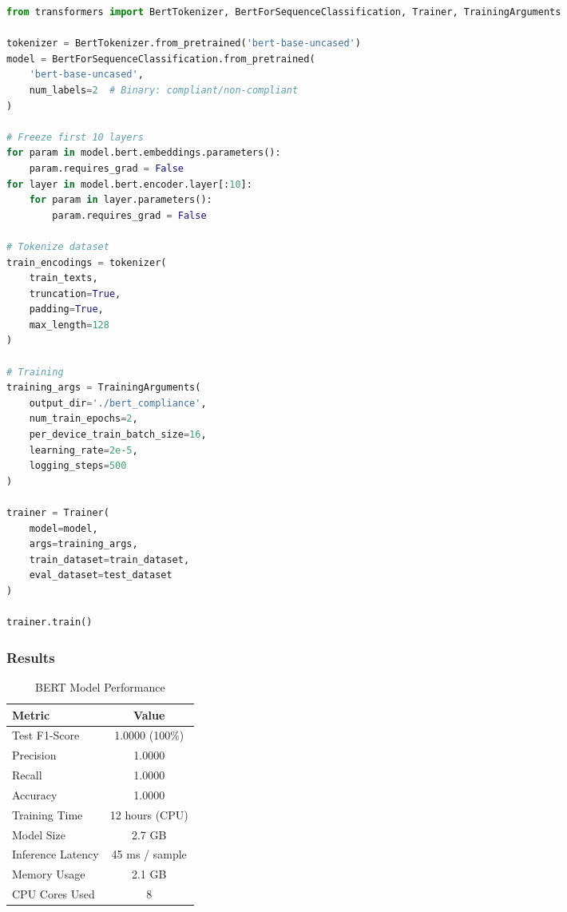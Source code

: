 \documentclass[11pt,conference]{IEEEtran}
\begin{document}
\begin{lstlisting}[language=Python]
from transformers import BertTokenizer, BertForSequenceClassification, Trainer, TrainingArguments

tokenizer = BertTokenizer.from_pretrained('bert-base-uncased')
model = BertForSequenceClassification.from_pretrained(
    'bert-base-uncased',
    num_labels=2  # Binary: compliant/non-compliant
)

# Freeze first 10 layers
for param in model.bert.embeddings.parameters():
    param.requires_grad = False
for layer in model.bert.encoder.layer[:10]:
    for param in layer.parameters():
        param.requires_grad = False

# Tokenize dataset
train_encodings = tokenizer(
    train_texts,
    truncation=True,
    padding=True,
    max_length=128
)

# Training
training_args = TrainingArguments(
    output_dir='./bert_compliance',
    num_train_epochs=2,
    per_device_train_batch_size=16,
    learning_rate=2e-5,
    logging_steps=500
)

trainer = Trainer(
    model=model,
    args=training_args,
    train_dataset=train_dataset,
    eval_dataset=test_dataset
)

trainer.train()
\end{lstlisting}

\subsubsection{Results}

\begin{table}[h]
\centering
\caption{BERT Model Performance}
\begin{tabular}{|l|c|}
\hline
\textbf{Metric} & \textbf{Value} \\
\hline
Test F1-Score & 1.0000 (100\%) \\
\hline
Precision & 1.0000 \\
\hline
Recall & 1.0000 \\
\hline
Accuracy & 1.0000 \\
\hline
Training Time & 12 hours (CPU) \\
\hline
Model Size & 2.7 GB \\
\hline
Inference Latency & 45 ms / sample \\
\hline
Memory Usage & 2.1 GB \\
\hline
CPU Cores Used & 8 \\
\hline
\end{tabular}
\end{table}
\end{document}
